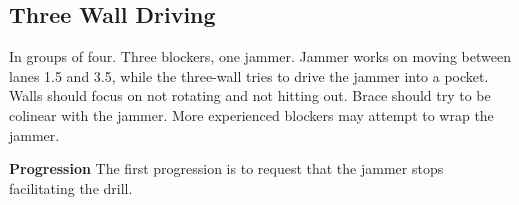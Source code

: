 \subsection*{Three Wall Driving}
\label{drill:three_wall:driving}

In groups of four. 
Three blockers, one jammer.
Jammer works on moving between lanes 1.5 and 3.5, while the three-wall tries to drive the jammer into a pocket.
Walls should focus on not rotating and not hitting out.  
Brace should try to be colinear with the jammer. 
More experienced blockers may attempt to wrap the jammer.

{\bf Progression}
The first progression is to request that the jammer stops facilitating the drill.
